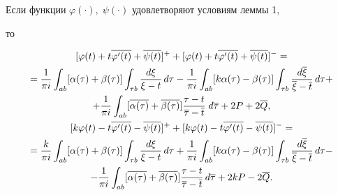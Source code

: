 \begin{cor}


Если функции $\varphi(\cdot),\;\psi(\cdot)$ удовлетворяют условиям леммы 1,


то


\begin{gather}


[\varphi(t)+t\overline{\varphi'(t)}+\overline{\psi(t)}]^+


+ [\varphi(t)+t\overline{\varphi'(t)}+\overline{\psi(t)}]^- = \notag \\


%


= \frac{1}{\pi i}\int_{ab} [\alpha(\tau)+\beta(\tau)]


\int_{\tau b}\frac{d\xi}{\xi-t}\,d\tau


- \frac{1}{\pi i}\int_{ab} [k\alpha(\tau)-\beta(\tau)]


\int_{\tau b}\frac{d\overline{\xi}}{\overline{\xi}-\overline{t}}\,


d\tau + \notag \\


%


+ \frac{1}{\pi i}\int_{ab} [\overline{\alpha(\tau)}


+\overline{\beta(\tau)}]


\frac{\tau-t}{\overline{\tau}-\overline{t}}\;d\overline{\tau} + 2P


+ 2\overline{Q}, \\


%


[k\varphi(t)-t\overline{\varphi'(t)}-\overline{\psi(t)}]^+


+ [k\varphi(t)-t\overline{\varphi'(t)}-\overline{\psi(t)}]^- = \notag \\


%


= \frac{k}{\pi i}\int_{ab} [\alpha(\tau)+\beta(\tau)]


\int_{\tau b}\frac{d\xi}{\xi-t}\,d\tau


+ \frac{1}{\pi i}\int_{ab} [k\alpha(\tau)-\beta(\tau)]


\int_{\tau b}\frac{d\overline{\xi}}{\overline{\xi}-\overline{t}}\,


d\tau - \notag \\


%


- \frac{1}{\pi i}\int_{ab} [\overline{\alpha(\tau)}


+\overline{\beta(\tau)}]


\frac{\tau-t}{\overline{\tau}-\overline{t}}\,d\overline{\tau} + 2kP


- 2\overline{Q}.


\end{gather}


\end{cor}





